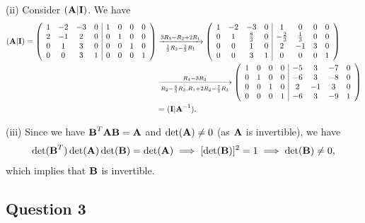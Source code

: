 \documentclass[12pt]{amsart}
\theoremstyle{plain}
\theoremstyle{definition}
\def\bf{\textbf}
\newcommand{\RA}{\implies}
\begin{document}
(ii) Consider $(\bf A|\bf I)$. We have
\begin{align*}
	(\bf A|\bf I)=\left(
	\begin{array}{cccc|cccc}
		1 & -2 & -3 & 0 & 1 & 0 & 0 & 0\\
		2 & -1 & 2 & 0 & 0 & 1 & 0 & 0\\
		0 & 1 & 3 & 0 & 0 & 0 & 1 & 0\\
		0 & 0 & 3 & 1 & 0 & 0 & 0 & 1\\
	\end{array}
	\right)
	&\xrightarrow[\frac13R_2-\frac23R_1]{3R_3-R_2+2R_1}
	\left(
	\begin{array}{cccc|cccc}
		1 & -2 & -3 & 0 & 1 & 0 & 0 & 0\\
		0 & 1 & \frac83 & 0 & -\frac23 & \frac13 & 0 & 0\\
		0 & 0 & 1 & 0 & 2 & -1 & 3 & 0\\
		0 & 0 & 3 & 1 & 0 & 0 & 0 & 1\\
	\end{array}
	\right)\\
	&\xrightarrow[R_2-\frac83R_3, R_1+2R_2-\frac73R_3]{R_4-3R_3}
	\left(
	\begin{array}{cccc|cccc}
		1 & 0 & 0 & 0 & -5 & 3 & -7 & 0\\
		0 & 1 & 0 & 0 & -6 & 3 & -8 & 0\\
		0 & 0 & 1 & 0 & 2 & -1 & 3 & 0\\
		0 & 0 & 0 & 1 & -6 & 3 & -9 & 1\\
	\end{array}
	\right)\\
	&=(\bf I|\bf A^{-1}).
\end{align*}

(iii) Since we have $\bf B^T\bf A\bf B=\bf A$ and $\det(\bf A)\neq 0$ (as $\bf A$ is invertible), we have
\begin{align*}
	\det(\bf B^T)\det(\bf A)\det(\bf B)=\det(\bf A)\RA[\det(\bf B)]^2=1\RA\det(\bf B)\neq 0,
\end{align*}
which implies that $\bf B$ is invertible.

\subsection*{Question 3}\
\end{document}
